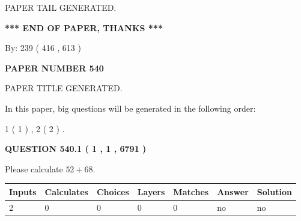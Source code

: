 \documentclass[12pt]{article}
\begin{document}
   
   
\vspace{2.0in} PAPER TAIL GENERATED.
   
   
   
   
\vspace{1.0in} 
{\textbf{\large{ *** END OF PAPER, THANKS *** }}} 
   
   
\hspace{1.0in} By: 
 239 ( 416 ,  613 )
   
   
   
   
\newpage 
\setcounter{page}{ 
   540001 } 
   
   
   
   
 {\textbf{ \Large{ PAPER NUMBER  540  }}}
   
   
\vspace{0.2in}
   
   
   
   
   
   
   
   
 \vspace{0.2in}
 
 
 
 
   
   
 PAPER TITLE GENERATED.
   
   
   
\vspace{0.2in}
   
In this paper, big questions will be generated in the following order: 
   
   
   1 ( 1 )
 ,
   2 ( 2 )
 .
  
\vspace{0.2in}
  
{\textbf{\Large{QUESTION
540.1 
 ( 1 , 1 , 6791 )
}}}
  
  
 
Please calculate $ %
52 +  %
68 $.
 
 
   
   
   
   
\noindent\begin{tabular}{|l|l|l|l|l|l|l|}
 \hline
Inputs & Calculates & Choices & Layers & Matches & Answer & Solution \\ \hline
 2  & 
 0  & 
 0
  & 
 0  & 
 0  & 
  no & 
  no 
  \\ \hline
 \end{tabular}
   
\end{document}

